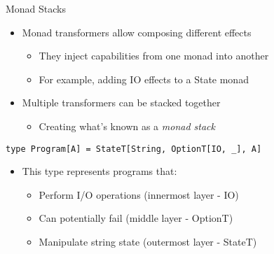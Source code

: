 \documentclass[presentation, 10pt]{beamer}\mode<presentation>{\usetheme{metropolis}}
\begin{document}
\begin{frame}[fragile]{Monad Stacks}
\begin{itemize}
	\item Monad transformers allow composing different effects
	\begin{itemize}
		\item They inject capabilities from one monad into another
		\item For example, adding IO effects to a State monad
	\end{itemize}
	\item Multiple transformers can be stacked together
	\begin{itemize}
		\item Creating what's known as a \emph{monad stack}
	\end{itemize}
\end{itemize}
\begin{tcolorbox}
\begin{verbatim}
type Program[A] = StateT[String, OptionT[IO, _], A]
\end{verbatim}
\end{tcolorbox}

\begin{itemize}
	\item This type represents programs that:
	\begin{itemize}
		\item Perform I/O operations (innermost layer - IO)
		\item Can potentially fail (middle layer - OptionT)
		\item Manipulate string state (outermost layer - StateT)
	\end{itemize}
\end{itemize}
\end{frame}
\end{document}
